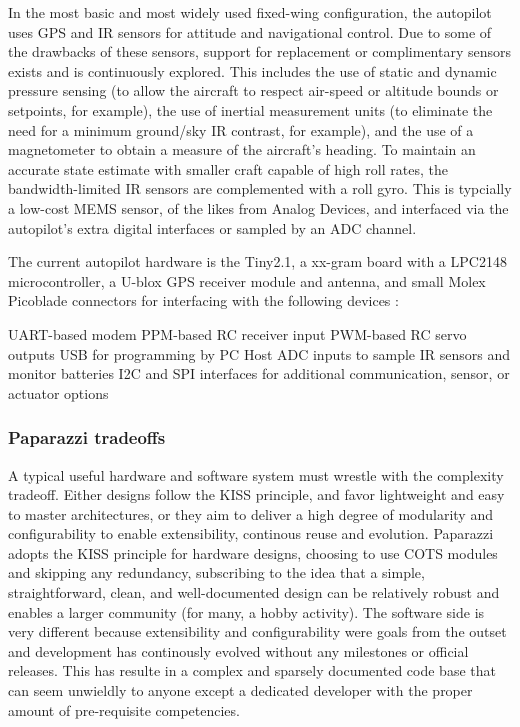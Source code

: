 \documentclass[a4paper,11pt]{report}
\begin{document}
In the most basic and most widely used fixed-wing configuration, the autopilot uses GPS and IR sensors for attitude and navigational control. Due to some of the drawbacks of these sensors, support for replacement or complimentary sensors exists and is continuously explored. This includes the use of static and dynamic pressure sensing (to allow the aircraft to respect air-speed or altitude bounds or setpoints, for example), the use of inertial measurement units (to eliminate the need for a minimum ground/sky IR contrast, for example), and the use of a magnetometer to obtain a measure of the aircraft's heading. To maintain an accurate state estimate with smaller craft capable of high roll rates, the bandwidth-limited IR sensors are complemented with a roll gyro. This is typcially a low-cost MEMS sensor, of the likes from Analog Devices, and interfaced via the autopilot's extra digital interfaces or sampled by an ADC channel.

The current autopilot hardware is the Tiny2.1, a xx-gram board with a LPC2148 microcontroller, a U-blox GPS receiver module and antenna, and small Molex Picoblade connectors for interfacing with the following devices :

UART-based modem
PPM-based RC receiver input
PWM-based RC servo outputs
USB for programming by PC Host
ADC inputs to sample IR sensors and monitor batteries
I2C and SPI interfaces for additional communication, sensor, or actuator options

\subsubsection{Paparazzi tradeoffs}

A typical useful hardware and software system must wrestle with the complexity tradeoff. Either designs follow the KISS principle, and favor lightweight and easy to master architectures, or they aim to deliver a high degree of modularity and configurability to enable extensibility, continous reuse and evolution. Paparazzi adopts the KISS principle for hardware designs, choosing to use COTS modules and skipping any redundancy, subscribing to the idea that a simple, straightforward, clean, and well-documented design can be relatively robust and enables a larger community (for many, a hobby activity). The software side is very different because extensibility and configurability were goals from the outset and development has continously evolved without any milestones or official releases. This has resulte in a complex and sparsely documented code base that can seem unwieldly to anyone except a dedicated developer with the proper amount of pre-requisite competencies.
\end{document}
